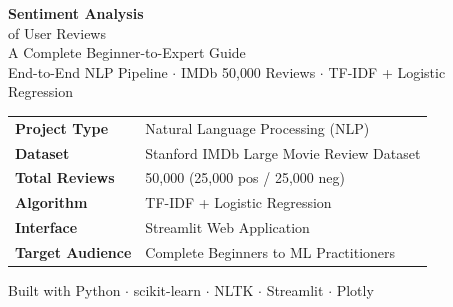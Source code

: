 \documentclass[12pt, a4paper]{article}
\begin{document}
\begin{titlepage}

\vspace*{2cm}
\begin{center}
  {\Huge\bfseries\color{white} Sentiment Analysis}\\[0.4em]
  {\Large\color{white!80} of User Reviews}\\[2em]
  {\large\color{white!70} A Complete Beginner-to-Expert Guide}\\[0.6em]
  {\normalsize\color{white!60} End-to-End NLP Pipeline $\cdot$ IMDb 50{,}000 Reviews $\cdot$ TF-IDF + Logistic Regression}
\end{center}

\vspace{4cm}

\begin{center}
\begin{tcolorbox}[
  colback=white, colframe=primary!30,
  width=0.8\textwidth, arc=10pt,
  left=15pt, right=15pt, top=12pt, bottom=12pt,
]
\centering
\begin{tabular}{ll}
  \textbf{Project Type}   & Natural Language Processing (NLP) \\[4pt]
  \textbf{Dataset}        & Stanford IMDb Large Movie Review Dataset \\[4pt]
  \textbf{Total Reviews}  & 50{,}000 (25{,}000 pos / 25{,}000 neg) \\[4pt]
  \textbf{Algorithm}      & TF-IDF + Logistic Regression \\[4pt]
  \textbf{Interface}      & Streamlit Web Application \\[4pt]
  \textbf{Target Audience}& Complete Beginners to ML Practitioners \\
\end{tabular}
\end{tcolorbox}
\end{center}

\vfill
\begin{center}
  \textcolor{mutedtext}{\small Built with Python $\cdot$ scikit-learn $\cdot$ NLTK $\cdot$ Streamlit $\cdot$ Plotly}
\end{center}
\end{titlepage}
\end{document}
